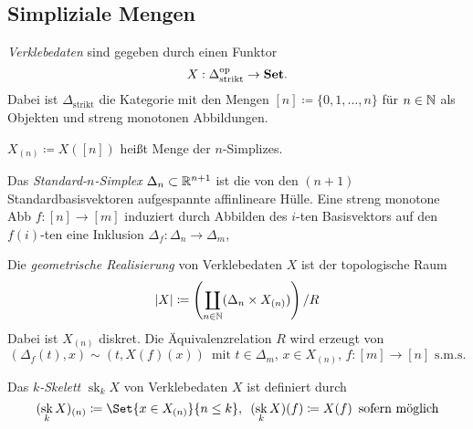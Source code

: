 \documentclass{cheat-sheet}
\DeclareMathOperator{\sk}{sk} %
\begin{document}
\begin{samepage}

\section{Simpliziale Mengen}

\end{samepage}


\begin{defn}
  \emph{Verklebedaten} sind gegeben durch einen Funktor
  \[ X : \Delta_{\text{strikt}}^{\mathrm{op}} \to \mathbf{Set}. \]
  Dabei ist $\Delta_{\text{strikt}}$ die Kategorie mit den Mengen
  $[n] \coloneqq \{ 0, 1, \ldots, n \}$ für $n \in \mathbb{N}$ als Objekten und streng monotonen Abbildungen.
\end{defn}

\begin{nota}
  $X_{(n)} \coloneqq X([n])$ heißt Menge der $n$-Simplizes.
\end{nota}

\begin{defn}
  Das \emph{Standard-$n$-Simplex} $\Delta_n \subset \mathbb{R}^{n+1}$ ist die von den $(n{+}1)$ Standardbasisvektoren aufgespannte affinlineare Hülle. Eine streng monotone Abb $f : [n] \to [m]$ induziert durch Abbilden des $i$-ten Basisvektors auf den $f(i)$-ten eine Inklusion $\Delta_f : \Delta_n \to \Delta_m$, 
\end{defn}

\begin{defn}
  Die \emph{geometrische Realisierung} von Verklebedaten $X$ ist der topologische Raum
  \[ \lvert X\rvert \coloneqq \left( \coprod_{n \in \mathbb{N}} (\Delta_n \times X_{(n)}) \right) / R \]
  Dabei ist $X_{(n)}$ diskret. Die Äquivalenzrelation $R$ wird erzeugt von
  \[
    (\Delta_f(t), x) \sim (t, X(f)(x)) \enspace
    \text{mit $t \in \Delta_m$, $x \in X_{(n)}$, $f : [m] {\to} [n]$ s.m.s.}
  \]
\end{defn}


\begin{defn}
  Das \emph{$k$-Skelett} $\sk_k X$ von Verklebedaten $X$ ist definiert durch
  \[
    (\sk_k X)_{(n)} \coloneqq
    \Set{ x \in X_{(n)} }{ n \leq k }, \enspace
    (\sk_k X)(f) \coloneqq X(f) \enspace \text{sofern möglich}
  \]
\end{defn}
\end{document}

